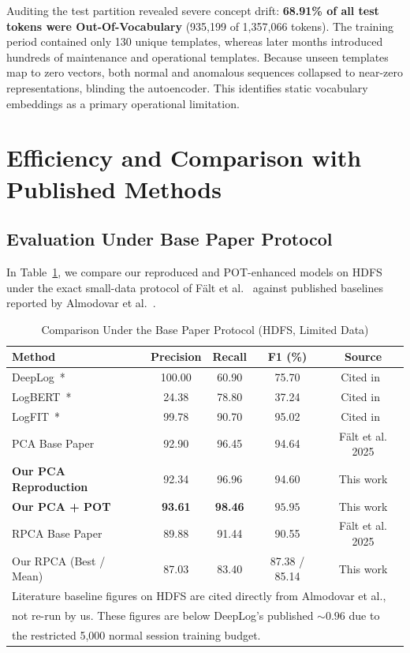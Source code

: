 \documentclass[conference]{IEEEtran}
\begin{document}
Auditing the test partition revealed severe concept drift: \textbf{68.91\% of all test tokens were Out-Of-Vocabulary} (935,199 of 1,357,066 tokens). The training period contained only 130 unique templates, whereas later months introduced hundreds of maintenance and operational templates. Because unseen templates map to zero vectors, both normal and anomalous sequences collapsed to near-zero representations, blinding the autoencoder. This identifies static vocabulary embeddings as a primary operational limitation.

\section{Efficiency and Comparison with Published Methods}
\label{sec:comparison}

\subsection{Evaluation Under Base Paper Protocol}
In Table~\ref{tab:hdfs_base_comparison}, we compare our reproduced and POT-enhanced models on HDFS under the exact small-data protocol of F{\"a}lt et al.~\cite{falt2025lightweight} against published baselines reported by Almodovar et al.~\cite{almodovar2024logfit}.

\begin{table}[htbp]
\centering
\caption{Comparison Under the Base Paper Protocol (HDFS, Limited Data)}
\label{tab:hdfs_base_comparison}
\begin{tabular}{lcccc}
\toprule
\textbf{Method} & \textbf{Precision} & \textbf{Recall} & \textbf{F1 (\%)} & \textbf{Source} \\
\midrule
DeepLog~\cite{du2017deeplog}* & 100.00 & 60.90 & 75.70 & Cited in~\cite{almodovar2024logfit} \\
LogBERT~\cite{guo2021logbert}* & 24.38 & 78.80 & 37.24 & Cited in~\cite{almodovar2024logfit} \\
LogFIT~\cite{almodovar2024logfit}* & 99.78 & 90.70 & 95.02 & Cited in~\cite{falt2025lightweight} \\
PCA Base Paper~\cite{falt2025lightweight} & 92.90 & 96.45 & 94.64 & F{\"a}lt et al. 2025 \\
\textbf{Our PCA Reproduction} & 92.34 & 96.96 & 94.60 & This work \\
\textbf{Our PCA + POT} & \textbf{93.61} & \textbf{98.46} & $\mathbf{95.95}$ & This work \\
RPCA Base Paper~\cite{falt2025lightweight} & 89.88 & 91.44 & 90.55 & F{\"a}lt et al. 2025 \\
Our RPCA (Best / Mean) & 87.03 & 83.40 & 87.38 / 85.14 & This work \\
\bottomrule
\multicolumn{5}{l}{\footnotesize *Literature baseline figures on HDFS are cited directly from Almodovar et al.,} \\
\multicolumn{5}{l}{\footnotesize not re-run by us. These figures are below DeepLog's published $\sim 0.96$ due to} \\
\multicolumn{5}{l}{\footnotesize the restricted 5,000 normal session training budget.}
\end{tabular}
\end{table}
\end{document}
